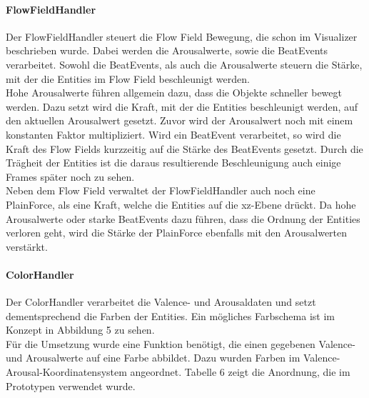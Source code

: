 \documentclass[11pt,a4paper]{article}
\begin{document}
\paragraph{FlowFieldHandler}
Der FlowFieldHandler steuert die Flow Field Bewegung, die schon im Visualizer beschrieben wurde. Dabei werden die Arousalwerte, sowie die BeatEvents verarbeitet. Sowohl die BeatEvents, als auch die Arousalwerte steuern die Stärke, mit der die Entities im Flow Field beschleunigt werden.\\
Hohe Arousalwerte führen allgemein dazu, dass die Objekte schneller bewegt werden. Dazu setzt wird die Kraft, mit der die Entities beschleunigt werden, auf den aktuellen Arousalwert gesetzt. Zuvor wird der Arousalwert noch mit einem konstanten Faktor multipliziert. Wird ein BeatEvent verarbeitet, so wird die Kraft des Flow Fields kurzzeitig auf die Stärke des BeatEvents gesetzt. Durch die Trägheit der Entities ist die daraus resultierende Beschleunigung auch einige Frames später noch zu sehen.\\
Neben dem Flow Field verwaltet der FlowFieldHandler auch noch eine PlainForce, als eine Kraft, welche die Entities auf die xz-Ebene drückt. Da hohe Arousalwerte oder starke BeatEvents dazu führen, dass die Ordnung der Entities verloren geht, wird die Stärke der PlainForce ebenfalls mit den Arousalwerten verstärkt.

\paragraph{ColorHandler}
Der ColorHandler verarbeitet die Valence- und Arousaldaten und setzt dementsprechend die Farben der Entities. Ein mögliches Farbschema ist im Konzept in Abbildung 5 zu sehen.\\
Für die Umsetzung wurde eine Funktion benötigt, die einen gegebenen Valence- und Arousalwerte auf eine Farbe abbildet. Dazu wurden Farben im Valence-Arousal-Koordinatensystem angeordnet. Tabelle 6 zeigt die Anordnung, die im Prototypen verwendet wurde.
\end{document}
